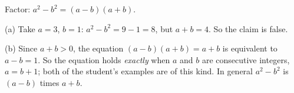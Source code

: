 Factor: $a^2-b^2=(a-b)(a+b)$.

(a) Take $a=3$, $b=1$: $a^2-b^2=9-1=8$, but $a+b=4$. So the claim is false.

(b) Since $a+b>0$, the equation $(a-b)(a+b)=a+b$ is equivalent to $a-b=1$. So the equation holds \emph{exactly} when $a$ and $b$ are consecutive integers, $\boxed{a=b+1}$; both of the student's examples are of this kind. In general $a^2-b^2$ is $(a-b)$ times $a+b$.
